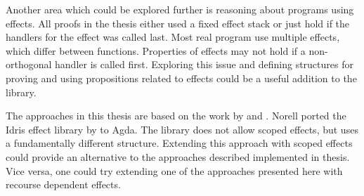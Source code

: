 \documentclass[10pt,a4paper,twoside,notitlepage]{report}
\begin{document}
Another area which could be explored further is reasoning about programs using
effects.
All proofs in the thesis either used a fixed effect stack or just hold if the
handlers for the effect was called last.
Most real program use multiple effects, which differ between functions.
Properties of effects may not hold if a non-orthogonal handler is called first.
Exploring this issue and defining structures for proving and using propositions
related to effects could be a useful addition to the library.

The approaches in this thesis are based on the work by
\textcite{DBLP:conf/haskell/WuSH14} and \textcite{DBLP:conf/lics/PirogSWJ18}.
Norell ported the Idris effect library by \textcite{DBLP:conf/icfp/Brady13} to
Agda.
The library does not allow scoped effects, but uses a fundamentally different
structure.
Extending this approach with scoped effects could provide an alternative to the
approaches described implemented in thesis.
Vice versa, one could try extending one of the approaches presented here with
recourse dependent effects.


\printbibliography
\end{document}
